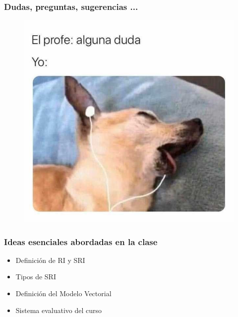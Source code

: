 \documentclass[
	10pt, %
	aspectratio=169, %
]{beamer}
\begin{document}
\begin{frame}
	
	\frametitle{Dudas, preguntas, sugerencias ...}
	
	\begin{figure}[h]
		\centering
		\includegraphics[scale=0.38]{duda_1.jpg}
	\end{figure}
	
\end{frame}


\begin{frame}
	
	\frametitle{Ideas esenciales abordadas en la clase}
	
	\begin{itemize}
		
		\item Definición de RI y SRI
		
		\item Tipos de SRI
		
		\item Definición del Modelo Vectorial
		
		\item Sistema evaluativo del curso
		
	\end{itemize}
	
	
	
\end{frame}
\end{document}

